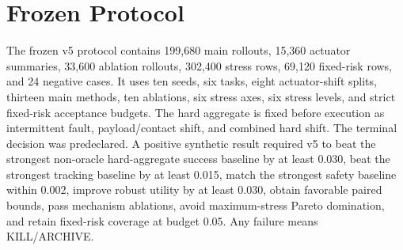 \documentclass{article}
\begin{document}
\section{Frozen Protocol}
The frozen v5 protocol contains 199,680 main rollouts, 15,360 actuator summaries, 33,600 ablation rollouts, 302,400 stress rows, 69,120 fixed-risk rows, and 24 negative cases. It uses ten seeds, six tasks, eight actuator-shift splits, thirteen main methods, ten ablations, six stress axes, six stress levels, and strict fixed-risk acceptance budgets. The hard aggregate is fixed before execution as intermittent fault, payload/contact shift, and combined hard shift.
The terminal decision was predeclared. A positive synthetic result required v5 to beat the strongest non-oracle hard-aggregate success baseline by at least 0.030, beat the strongest tracking baseline by at least 0.015, match the strongest safety baseline within 0.002, improve robust utility by at least 0.030, obtain favorable paired bounds, pass mechanism ablations, avoid maximum-stress Pareto domination, and retain fixed-risk coverage at budget 0.05. Any failure means KILL/ARCHIVE.
\end{document}

